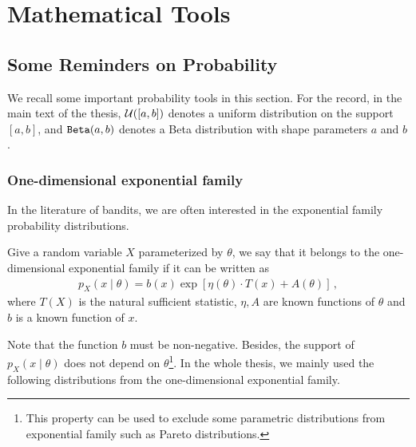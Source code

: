 \chapter{Mathematical Tools}\label{CHAP:MATHS}


\section{Some Reminders on Probability}\label{app:maths.proba}

We recall some important probability tools in this section. For the record, in the main text of the thesis, $\mathcal{U}([a,b])$ denotes a uniform distribution on the support $[a,b]$, and $\texttt{Beta}(a,b)$ denotes a Beta distribution with shape parameters $a$ and $b$.

\subsection{One-dimensional exponential family}\label{app:maths.proba.exponential}

In the literature of bandits, we are often interested in the exponential family probability distributions. 

\begin{definition}\label{def:maths.exponential}
\begin{leftbar}[defnbar]
    Give a random variable $X$ parameterized by $\theta$, we say that it belongs to the one-dimensional exponential family if it can be written as
    \begin{align}
        p_{X}(x \mid \theta ) = b(x) \exp \left[\eta (\theta ) \cdot T(x) + A(\theta )\right]\,,
    \end{align}
    where $T(X)$ is the natural sufficient statistic, $\eta,A$ are known functions of $\theta$ and $b$ is a known function of $x$.
\end{leftbar}
\end{definition}

Note that the function $b$ must be non-negative. Besides, the support of $p_{X}(x \mid \theta )$ does not depend on $\theta$\footnote{This property can be used to exclude some parametric distributions from exponential family such as Pareto distributions.}. In the whole thesis, we mainly used the following distributions from the one-dimensional exponential family.

